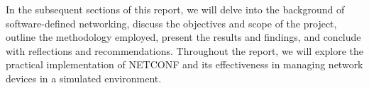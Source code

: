 In the subsequent sections of this report, we will delve into the background of software-defined networking, discuss the objectives and scope of the project, outline the methodology employed, present the results and findings, and conclude with reflections and recommendations. Throughout the report, we will explore the practical implementation of NETCONF and its effectiveness in managing network devices in a simulated environment.










